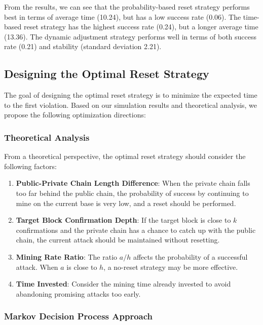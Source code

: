 \documentclass[12pt,a4paper]{article}
\begin{document}
From the results, we can see that the probability-based reset strategy performs best in terms of average time (10.24), but has a low success rate (0.06). The time-based reset strategy has the highest success rate (0.24), but a longer average time (13.36). The dynamic adjustment strategy performs well in terms of both success rate (0.21) and stability (standard deviation 2.21).

\subsection{Designing the Optimal Reset Strategy}

The goal of designing the optimal reset strategy is to minimize the expected time to the first violation. Based on our simulation results and theoretical analysis, we propose the following optimization directions:

\subsubsection{Theoretical Analysis}

From a theoretical perspective, the optimal reset strategy should consider the following factors:

\begin{enumerate}
    \item \textbf{Public-Private Chain Length Difference}: When the private chain falls too far behind the public chain, the probability of success by continuing to mine on the current base is very low, and a reset should be performed.
    \item \textbf{Target Block Confirmation Depth}: If the target block is close to $k$ confirmations and the private chain has a chance to catch up with the public chain, the current attack should be maintained without resetting.
    \item \textbf{Mining Rate Ratio}: The ratio $a/h$ affects the probability of a successful attack. When $a$ is close to $h$, a no-reset strategy may be more effective.
    \item \textbf{Time Invested}: Consider the mining time already invested to avoid abandoning promising attacks too early.
\end{enumerate}

\subsubsection{Markov Decision Process Approach}
\end{document}
